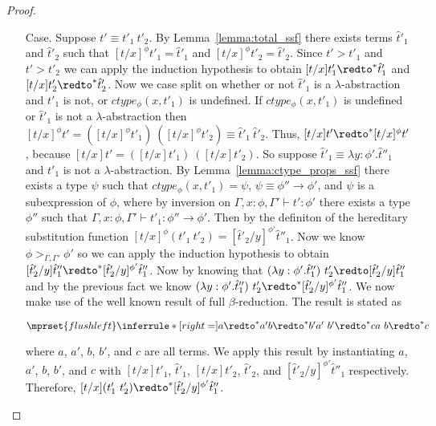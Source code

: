 \begin{proof}
\begin{itemize}
\item[Case.] Suppose $t' \equiv t'_1\ t'_2$.  By Lemma~\ref{lemma:total_ssf}
  there exists terms $\hat{t}'_1$ and $\hat{t}'_2$
  such that $[t/x]^\phi t'_1 = \hat{t}'_1$ and $[t/x]^\phi t'_2 = \hat{t}'_2$.  Since
  $t' > t'_1$ and $t' > t'_2$ we can apply the induction hypothesis to obtain
  $[t/x]t'_1 \redto^* \hat{t}'_1$ and $[t/x]t'_2 \redto^* \hat{t}'_2$.  Now we case
  split on whether or not $\hat{t}'_1$ is a $\lambda$-abstraction and $t'_1$ is not, or $ctype_\phi(x,t'_1)$ is undefined. If
  $ctype_\phi(x,t'_1)$ is undefined or $\hat{t}'_1$ is not a $\lambda$-abstraction then 
  $[t/x]^\phi t' = ([t/x]^\phi t'_1)\ ([t/x]^\phi t'_2) \equiv \hat{t}'_1\ \hat{t}'_2$. Thus,
  $[t/x]t' \redto^* [t/x]^\phi t'$, because $[t/x]t' = ([t/x] t'_1)\ ([t/x] t'_2)$.  So suppose 
  $\hat{t}'_1 \equiv \lambda y:\phi'.\hat{t}''_1$ and $t'_1$ is not a $\lambda$-abstraction.  
  By Lemma~\ref{lemma:ctype_props_ssf} there exists a type $\psi$ such that
  $ctype_\phi(x,t'_1) = \psi$, $\psi \equiv \phi'' \to \phi'$, and $\psi$ is a subexpression
  of $\phi$, where by inversion on $\Gamma,x:\phi,\Gamma' \vdash t':\phi'$ there exists a type
  $\phi''$ such that $\Gamma,x:\phi,\Gamma' \vdash t'_1:\phi'' \to \phi'$.  
  Then by the definiton of the hereditary substitution function $[t/x]^\phi (t'_1\ t'_2) = 
  [\hat{t}'_2/y]^{\phi'} \hat{t}''_1$.
  Now we know $\phi >_{\Gamma,\Gamma'} \phi'$ so 
  we can apply the induction hypothesis to obtain 
  $[\hat{t}'_2/y] \hat{t}''_1 \redto^* [\hat{t}'_2/y]^{\phi'} \hat{t}''_1$.  Now by knowing that 
  $(\lambda y:\phi'.\hat{t}''_1)\ t'_2 \redto [\hat{t}'_2/y] \hat{t}''_1$ and
  by the previous fact we know $(\lambda y:\phi'.\hat{t}''_1)\ t'_2 \redto^* [\hat{t}'_2/y]^{\phi'} \hat{t}''_1$.
  We now make use of the well known result of full $\beta$-reduction.  The
  result is stated as
  \begin{center}
    \begin{math}
      $$\mprset{flushleft}
      \inferrule* [right=] {
        a \redto^* a'
        \\\\
        b \redto^* b'
        \\
        a'\ b' \redto^* c
      }{a\ b \redto^* c}
    \end{math}
  \end{center}
  where $a$, $a'$, $b$, $b'$, and $c$ are all terms.  We apply this
  result by instantiating $a$, $a'$, $b$, $b'$, and $c$ with
  $[t/x] t'_1$, $\hat{t}'_1$, $[t/x] t'_2$, $\hat{t}'_2$, and $[\hat{t}'_2/y]^{\phi'} \hat{t}''_1$ 
  respectively.  Therefore, $[t/x](t'_1\ t'_2) \redto^* [\hat{t}'_2/y]^{\phi'} \hat{t}''_1$.    
  

\end{itemize}
\end{proof}
